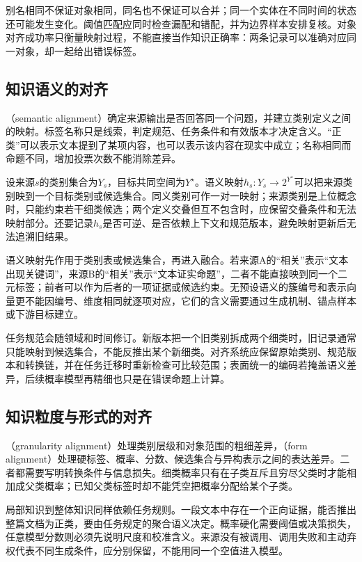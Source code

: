 别名相同不保证对象相同，同名也不保证可以合并；同一个实体在不同时间的状态还可能发生变化。阈值匹配应同时检查漏配和错配，并为边界样本安排复核。对象对齐成功率只衡量映射过程，不能直接当作知识正确率：两条记录可以准确对应同一对象，却一起给出错误标签。

\subsection{知识语义的对齐}
\label{sec:knowledge-fusion-semantic-alignment}

（semantic alignment）确定来源输出是否回答同一个问题，并建立类别定义之间的映射。标签名称只是线索，判定规范、任务条件和有效版本才决定含义。“正类”可以表示文本提到了某项内容，也可以表示该内容在现实中成立；名称相同而命题不同，增加投票次数不能消除差异。

设来源$s$的类别集合为$Y_s$，目标共同空间为$Y^\star$。语义映射$h_s:Y_s\to 2^{Y^\star}$可以把来源类别映到一个目标类别或候选集合。同义类别可作一对一映射；来源类别是上位概念时，只能约束若干细类候选；两个定义交叠但互不包含时，应保留交叠条件和无法映射部分。还要记录$h_s$是否可逆、是否依赖上下文和规范版本，避免映射更新后无法追溯旧结果。

语义映射先作用于类别表或候选集合，再进入融合。若来源A的“相关”表示“文本出现关键词”，来源B的“相关”表示“文本证实命题”，二者不能直接映到同一个二元标签；前者可以作为后者的一项证据或候选约束。无预设语义的簇编号和表示向量更不能因编号、维度相同就逐项对应，它们的含义需要通过生成机制、锚点样本或下游目标建立。

任务规范会随领域和时间修订。新版本把一个旧类别拆成两个细类时，旧记录通常只能映射到候选集合，不能反推出某个新细类。对齐系统应保留原始类别、规范版本和转换链，并在任务迁移时重新检查可比较范围；表面统一的编码若掩盖语义差异，后续概率模型再精细也只是在错误命题上计算。

\subsection{知识粒度与形式的对齐}
\label{sec:knowledge-fusion-granularity-form-alignment}

（granularity alignment）处理类别层级和对象范围的粗细差异，（form alignment）处理硬标签、概率、分数、候选集合与异构表示之间的表达差异。二者都需要写明转换条件与信息损失。细类概率只有在子类互斥且穷尽父类时才能相加成父类概率；已知父类标签时却不能凭空把概率分配给某个子类。

局部知识到整体知识同样依赖任务规则。一段文本中存在一个正向证据，能否推出整篇文档为正类，要由任务规定的聚合语义决定。概率硬化需要阈值或决策损失，任意模型分数则必须先说明尺度和校准含义。来源没有被调用、调用失败和主动弃权代表不同生成条件，应分别保留，不能用同一个空值进入模型。

